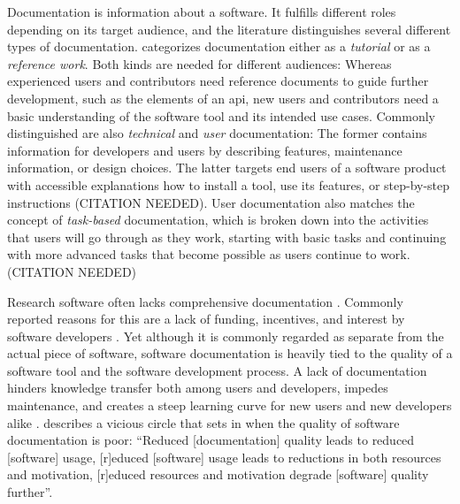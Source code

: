 Documentation is information about a software.
It fulfills different roles depending on its target audience, and the literature distinguishes several different types of documentation.
\citet{Parnas2011} categorizes documentation either as a \textit{tutorial} or as a \textit{reference work}.
Both kinds are needed for different audiences: Whereas experienced users and contributors need reference documents to guide further development, such as the elements of an \gls{api}, new users and contributors need a basic understanding of the software tool and its intended use cases.
Commonly distinguished are also \textit{technical} and \textit{user} documentation: The former contains information for developers and users by describing features, maintenance information, or design choices.
The latter targets end users of a software product with accessible explanations how to install a tool, use its features, or step-by-step instructions (CITATION NEEDED). %
User documentation also matches the concept of \textit{task-based} documentation, which is broken down into the activities that users will go through as they work, starting with basic tasks and continuing with more advanced tasks that become possible as users continue to work. (CITATION NEEDED) %



Research software often lacks comprehensive documentation \citep{segal2007some} \citep{pawlik2012documentation}.
Commonly reported reasons for this are a lack of funding, incentives, and interest by software developers \citep{pawlik2012documentation}.
Yet although it is commonly regarded as separate from the actual piece of software, software documentation is heavily tied to the quality of a software tool and the software development process.
A lack of documentation hinders knowledge transfer both among users and developers, impedes maintenance, and creates a steep learning curve for new users and new developers alike \citep{theunissen}.
\citet{Parnas2011} describes a vicious circle that sets in when the quality of software documentation is poor:
``Reduced [documentation] quality leads to reduced [software] usage, [r]educed [software] usage leads to reductions in both resources and motivation, [r]educed resources and motivation degrade [software] quality further''.

